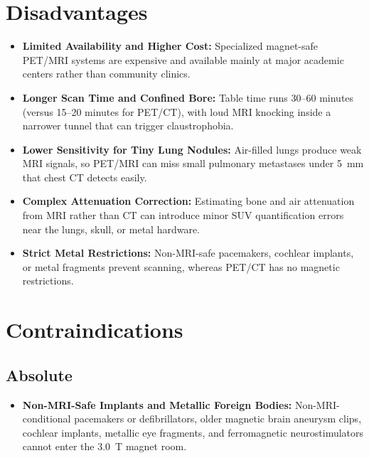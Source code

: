 \section{Disadvantages}
\begin{itemize}
\item \textbf{Limited Availability and Higher Cost:} Specialized magnet-safe PET/MRI systems are expensive and available mainly at major academic centers rather than community clinics.
\item \textbf{Longer Scan Time and Confined Bore:} Table time runs 30--60 minutes (versus 15--20 minutes for PET/CT), with loud MRI knocking inside a narrower tunnel that can trigger claustrophobia.
\item \textbf{Lower Sensitivity for Tiny Lung Nodules:} Air-filled lungs produce weak MRI signals, so PET/MRI can miss small pulmonary metastases under 5~mm that chest CT detects easily.
\item \textbf{Complex Attenuation Correction:} Estimating bone and air attenuation from MRI rather than CT can introduce minor SUV quantification errors near the lungs, skull, or metal hardware.
\item \textbf{Strict Metal Restrictions:} Non-MRI-safe pacemakers, cochlear implants, or metal fragments prevent scanning, whereas PET/CT has no magnetic restrictions.
\end{itemize}

\section{Contraindications}

\subsection{Absolute}
\begin{itemize}
\item \textbf{Non-MRI-Safe Implants and Metallic Foreign Bodies:} Non-MRI-conditional pacemakers or defibrillators, older magnetic brain aneurysm clips, cochlear implants, metallic eye fragments, and ferromagnetic neurostimulators cannot enter the 3.0~T magnet room.
\end{itemize}

